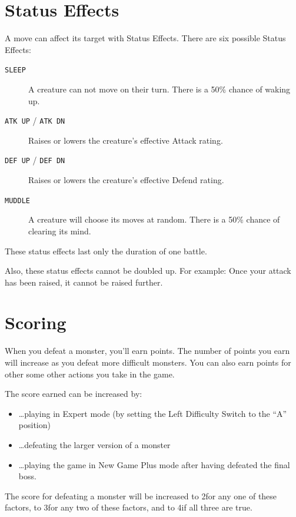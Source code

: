 \documentclass[10pt,twocolumn,openany,article]{memoir}
\begin{document}
\section{Status Effects}\label{sec:StatusEffects}

A move can affect its target with Status Effects. There are six possible
Status Effects:

\begin{description}
\item[\texttt{SLEEP}] A  creature can not  move on their turn.  There is
  a 50\% chance of waking up.
\item[\texttt{ATK UP} / \texttt{ATK DN}] Raises or lowers the creature's
  effective Attack rating.
\item[\texttt{DEF UP} / \texttt{DEF DN}] Raises or lowers the creature's
  effective Defend rating.
\item[\texttt{MUDDLE}]  A  creature will  choose  its  moves at  random.
  There is a 50\% chance of clearing its mind.
\end{description}

These status effects last only the duration of one battle.

Also, these status effects cannot be  doubled up. For example: Once your
attack has been raised, it cannot be raised further.

\section{Scoring}

When you  defeat a monster, you'll  earn points. The number  of points
you earn  will increase as you  defeat more difficult monsters.  You can
also earn points for other some other actions you take in the game.

The score earned can be increased by:

\begin{itemize}
\item \ldots{}playing  in Expert  mode (by  setting the  Left Difficulty
  Switch to the ``A'' position)
\item \ldots{}defeating the larger version of a monster
\item  \ldots{}playing the  game  in  New Game  Plus  mode after  having
  defeated the final boss.
\end{itemize}

The score for  defeating a monster will be increased  to 2\times for any
one of these  factors, to 3\times for  any two of these  factors, and to
4\times if all three are true.
\end{document}
